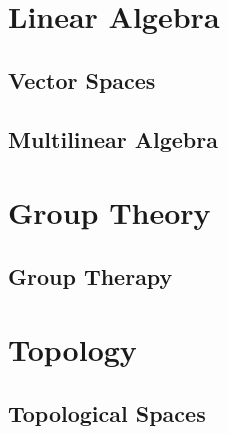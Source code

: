 

\part{Linear Algebra}

\chapter{Vector Spaces}










\chapter{Multilinear Algebra}







\part{Group Theory}

\chapter{Group Therapy}






\part{Topology}

\chapter{Topological Spaces}












